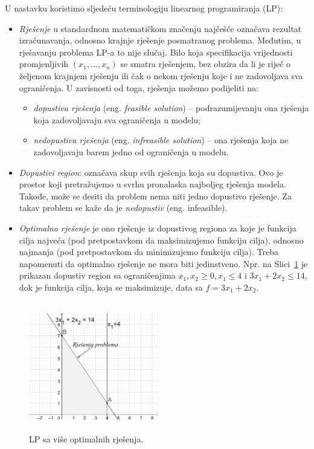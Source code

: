 \documentclass[a4paper, utf8, 11pt, colorlinks]{book}
\theoremstyle{definition}
\begin{document}
 U nastavku koristimo sljedeću terminologiju linearnog programiranja (LP):
\begin{itemize}
    \item \emph{Rješenje} u standardnom matematičkom značenju najčešće označava rezultat izračunavanja, odnosno krajnje rješenje posmatranog problema. Međutim, u rješavanju problema LP-a to  nije slučaj. Bilo koja specifikacija vrijednosti promjenljivih  $(x_1,\ldots, x_n)$ se smatra rješenjem, bez obzira da li je riječ o željenom krajnjem rješenju ili čak o nekom rješenju koje i ne zadovoljava sva ograničenja. U zavisnosti od toga, rješenja  možemo podijeliti na:
    \begin{itemize}
        \item \emph{dopustiva rješenja} (eng. \emph{feasible solution}) -- podrazumijevanju ona rješenja koja zadovoljavaju sva ograničenja u modelu;
        \item \emph{nedopustiva rješenja} (eng. \emph{infreasible solution}) -- ona rješenja koja ne zadovoljavaju barem jedno od ograničenja u modelu. 
    \end{itemize}
  \item \emph{Dopustivi region}: označava skup svih rješenja koja su dopustiva. Ovo je prostor koji pretražujemo u svrhu pronalaska najboljeg rješenja modela. Takođe, može se desiti da problem nema niti jedno dopustivo rješenje. Za takav problem se kaže da je \emph{nedopustiv} (eng. infeasible). 
  \item \emph{Optimalno rješenje} je ono rješenje iz dopustivog regiona za koje je funkcija cilja najveća (pod pretpostavkom da maksimizujemo funkciju cilja), odnosno najmanja (pod pretpostavkom da minimizujemo funkciju cilja). Treba napomenuti da optimalno rješenje ne mora biti jedinstveno.  Npr. na Slici~\ref{fig:multi_solution} je prikazan dopustiv region sa ograničenjima $x_1, x_2 \geq 0, x_1 \leq 4 $ i $3 x_1 + 2 x_2 \leq 14$, dok je funkcija cilja, koja se maksimizuje, data sa $f = 3x_1 + 2 x_2$.  
 \end{itemize}
 
 \begin{figure}
     \centering
     \includegraphics[width=160pt, height=160pt]{fig3.eps}
     \caption{LP sa više optimalnih rješenja.}
     \label{fig:multi_solution}
 \end{figure}
 
\end{document}
